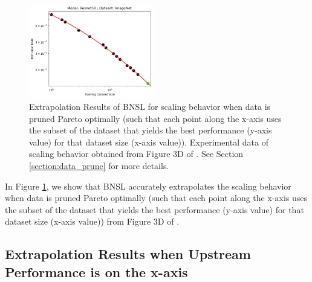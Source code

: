 \documentclass{article} %
\begin{document}
\begin{figure}[htbp]
    \centering
\includegraphics[width=0.48\textwidth]{figures/data_prune/resnet50_imagenet.png}

    \caption{
    Extrapolation Results of BNSL for scaling behavior when data is pruned Pareto optimally (such that each point along the x-axis uses the subset of the dataset that yields the best performance (y-axis value) for that dataset size (x-axis value)). Experimental data of scaling behavior obtained from Figure 3D of \cite{https://doi.org/10.48550/arxiv.2206.14486}. See Section \ref{section:data_prune} for more details.
    }
    \label{fig:data_prune}
\end{figure}

In Figure \ref{fig:data_prune}, we show that BNSL accurately extrapolates the scaling behavior when data is pruned Pareto optimally (such that each point along the x-axis uses the subset of the dataset that yields the best performance (y-axis value) for that dataset size (x-axis value)) from Figure 3D of \cite{https://doi.org/10.48550/arxiv.2206.14486}.

\FloatBarrier

\subsection{Extrapolation Results when Upstream Performance is on the x-axis}
\label{section:downstream_from_upstream}
\end{document}

